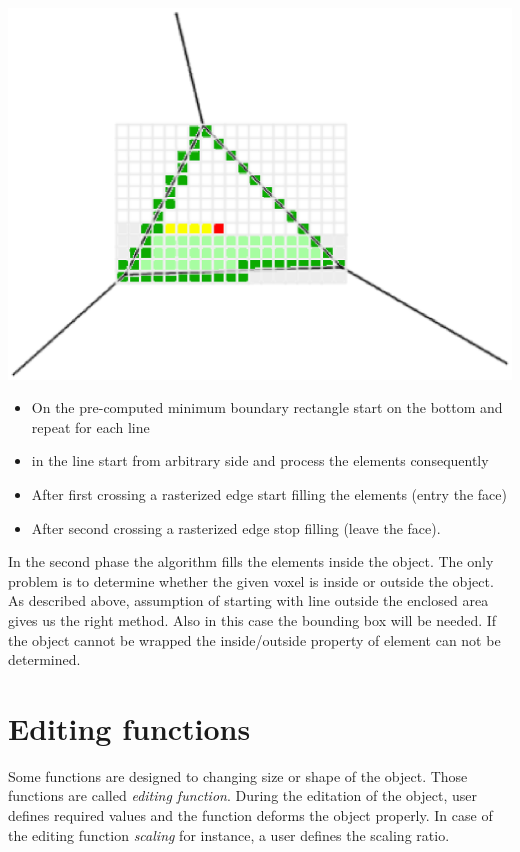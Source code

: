 \includegraphics[scale=0.2]{../img/voxelize_3.eps}

\begin{itemize}
\item On the pre-computed minimum boundary rectangle start on the bottom and repeat for each line
\item in the line start from arbitrary side and process the elements consequently
\item After first crossing a rasterized edge start filling the elements (entry the face)
\item After second crossing a rasterized edge stop filling (leave the face).

\end{itemize}

In the second phase the algorithm fills the elements inside the object. The only problem is to
determine whether the given voxel is inside or outside the object. As described above, assumption of
starting with line outside the enclosed area gives us the right method. Also in this case the
bounding box will be needed. If the object cannot be wrapped the inside/outside property of element can 
not be determined.

\section{Editing functions}

Some functions are designed to changing size or shape of the object. Those functions are called 
\emph{editing function}.
During the editation of the object, user defines required values and the function deforms the
object properly. In case of the editing function \emph{scaling} for instance, a user defines the scaling
ratio.

